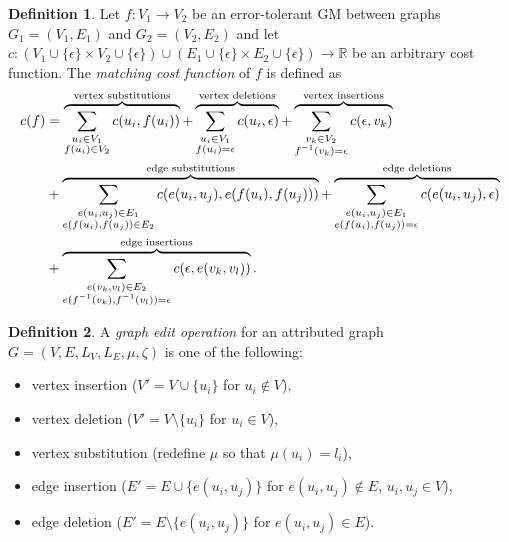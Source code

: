 \documentclass{article}
\theoremstyle{definition}
\newtheorem{definition}{Definition}
\begin{document}
\begin{definition}
  Let $f: V_1 \to V_2$ be an error-tolerant GM between graphs $G_1 = (V_1, E_1)$ and $G_2 = (V_2, E_2)$ and let $c: (V_1 \cup \{ \epsilon \} \times V_2 \cup \{ \epsilon \}) \cup (E_1 \cup \{ \epsilon \} \times E_2 \cup \{ \epsilon \}) \to \mathbb{R}$ be an arbitrary cost function. The \emph{matching cost function} of $f$ is defined as
  \[
  \begin{aligned}
    c(f) &= \overbrace{\sum_{\substack{u_i \in V_1\\ f(u_i) \in V_2}} c(u_i, f(u_i))}^{\mathclap{\text{vertex substitutions}}} + \overbrace{\sum_{\substack{u_i \in V_1\\ f(u_i) = \epsilon}} c(u_i, \epsilon)}^{\mathclap{\text{vertex deletions}}} + \overbrace{\sum_{\substack{v_k \in V_2\\ f^{-1}(v_k) = \epsilon}} c(\epsilon, v_k)}^{\mathclap{\text{vertex insertions}}} \\
    &+ \overbrace{\sum_{\substack{e(u_i, u_j) \in E_1\\ e(f(u_i), f(u_j)) \in E_2}} c(e(u_i, u_j), e(f(u_i), f(u_j)))}^{\mathclap{\text{edge substitutions}}} + \overbrace{\sum_{\substack{e(u_i, u_j) \in E_1\\ e(f(u_i), f(u_j)) = \epsilon}} c(e(u_i, u_j), \epsilon)}^{\mathclap{\text{edge deletions}}} \\
    &+ \overbrace{\sum_{\substack{e(v_k, v_l) \in E_2\\ e(f^{-1}(v_k), f^{-1}(v_l)) = \epsilon}} c(\epsilon, e(v_k, v_l))}^{\mathclap{\text{edge insertions}}}.
  \end{aligned}
  \]
\end{definition}
\begin{definition}
  A \emph{graph edit operation} for an attributed graph $G = (V, E, L_V, L_E, \mu, \zeta)$ is one of the following:
  \begin{itemize}
  \item vertex insertion ($V' = V \cup \{ u_i \}$ for $u_i \not \in V$),
  \item vertex deletion ($V' = V \setminus \{ u_i \}$ for $u_i \in V$),
  \item vertex substitution (redefine $\mu$ so that $\mu(u_i) = l_i$),
  \item edge insertion ($E' = E \cup \{ e(u_i, u_j) \}$ for $e(u_i, u_j) \not \in E$, $u_i, u_j \in V$),
  \item edge deletion ($E' = E \setminus \{ e(u_i, u_j) \}$ for $e(u_i, u_j) \in E$).
  \end{itemize}
\end{definition}
\end{document}

